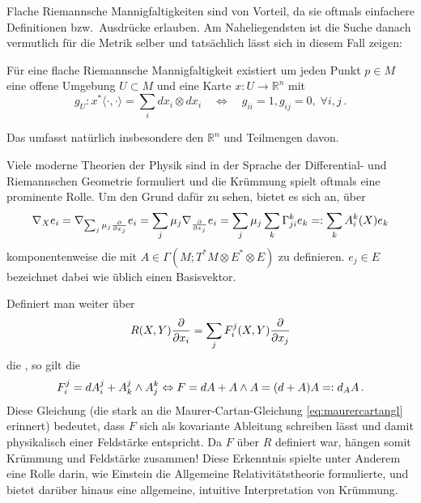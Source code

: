 \documentclass[../H_Analysis_main.tex]{subfiles}
\begin{document}
Flache Riemannsche Mannigfaltigkeiten sind von Vorteil, da sie oftmals einfachere Definitionen bzw.~Ausdrücke erlauben. Am Naheliegendsten ist die Suche danach vermutlich für die Metrik selber und tatsächlich lässt sich in diesem Fall zeigen:

\begin{cor}
Für eine flache Riemannsche Mannigfaltigkeit existiert um jeden Punkt $p \in M$ eine offene Umgebung $U \subset M$ und eine Karte $x: U \rightarrow \mathbb{R}^n$ mit
\begin{equation}
g_U: x^* \langle \cdot, \cdot \rangle = \sum_i dx_i \otimes dx_i \quad \Leftrightarrow \quad g_{ii} = 1, g_{ij} = 0, \; \forall i, j \, .
\end{equation}
\end{cor}
Das umfasst natürlich insbesondere den $\mathbb{R}^n$ und Teilmengen davon.


\begin{bsp}
Viele moderne Theorien der Physik sind in der Sprache der Differential- und Riemannschen Geometrie formuliert und die Krümmung spielt oftmals eine prominente Rolle. Um den Grund dafür zu sehen, bietet es sich an, über
\begin{equation}
\nabla_X e_i = \nabla_{\sum_j \mu_j \pdv{x_j}} e_i = \sum_j \mu_j \nabla_{\pdv{x_j}} e_i = \sum_j \mu_j \sum_k \Gamma_{ji}^k e_k =: \sum_k A_i^k(X) e_k
\end{equation}
komponentenweise die  mit $A \in \Gamma(M; T^*M \otimes E^* \otimes E)$ zu definieren. $e_j \in E$ bezeichnet dabei wie üblich einen Basisvektor.

Definiert man weiter über
\begin{equation}
R(X, Y) \pdv{x_i} = \sum_j F_i^j(X, Y) \pdv{x_j}
\end{equation}
die , so gilt die 
\begin{equation}
F_i^j = dA_i^j + A_k^j \wedge A_j^k \Leftrightarrow F = dA + A \wedge A = \qty(d + A) A =: d_A A \, .
\end{equation}
Diese Gleichung (die stark an die Maurer-Cartan-Gleichung \eqref{eq:maurercartangl} erinnert) bedeutet, dass $F$ sich als kovariante Ableitung\footnotemark{} schreiben lässt und damit physikalisch einer Feldstärke entspricht. Da $F$ über $R$ definiert war, hängen somit Krümmung und Feldstärke zusammen! Diese Erkenntnis spielte unter Anderem eine Rolle darin, wie Einstein die Allgemeine Relativitätstheorie formulierte, und bietet darüber hinaus eine allgemeine, intuitive Interpretation von Krümmung.
\end{bsp}
\end{document}
